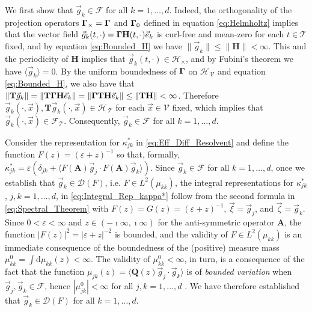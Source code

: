 \documentclass[11pt]{amsart}
\renewcommand{\d}{\mathrm{d}}
\newcommand{\Tb}{\mathbf{T}}
\newcommand{\Hb}{\mathbf{H}}
\newcommand{\Ab}{\mathbf{A}}
\newcommand{\Qb}{\mathbf{Q}}
\newcommand{\Tc}{\mathcal{T}}
\newcommand{\Vc}{\mathcal{V}}
\newcommand{\Hs}{\mathscr{H}}
\newcommand{\Ds}{\mathscr{D}}
\newcommand{\Fs}{\mathscr{F}}
\newcommand\bGamma{\mbox{\boldmath${\Gamma}$}}
\begin{document}
We first show that $\vec{g}_k\in\Fs$ for
all $k=1,\ldots,d$. Indeed, the orthogonality of the
projection operators $\bGamma_\times=\bGamma$ and $\bGamma_0$ defined in
equation \eqref{eq:Helmholtz} implies that the vector field
$\vec{g}_k(t,\cdot)=\bGamma\Hb(t,\cdot)\vec{e}_k$ is curl-free and mean-zero
for each $t\in\Tc$ fixed, and by equation \eqref{eq:Bounded_H} 
we have $\|\vec{g}_k\|\leq\|\Hb\|<\infty$. This and the periodicity of $\Hb$ implies
that $\vec{g}_k(t,\cdot)\in\Hs_\times$, and by Fubini's theorem \cite{Folland:99}
we have $\langle\vec{g}_k\rangle=0$.  By the uniform boundedness of $\bGamma$ on
$\Hs_{\,\Vc}$ and equation \eqref{eq:Bounded_H}, we also have
\cite{Folland:99} that
$\|\Tb\vec{g}_k\|=\|\Tb\bGamma\Hb\vec{e}_k\|=\|\bGamma\Tb\Hb\vec{e}_k\|\leq\|\Tb\Hb\|<\infty$.   
Therefore $\vec{g}_k(\cdot,\vec{x}),\Tb\vec{g}_k(\cdot,\vec{x})\in\Hs_{\,\Tc}$ for each
$\vec{x}\in\Vc$ fixed, which implies that
$\vec{g}_k(\cdot,\vec{x})\in\Fs_{\Tc}$. Consequently,  $\vec{g}_k\in\Fs$ for
all $k=1,\ldots,d$.



Consider the representation for $\kappa^*_{jk}$ in 
\eqref{eq:Eff_Diff_Resolvent} and define the function
$F(z)=(\varepsilon+z)^{-1}$ so that, formally,
$\kappa^*_{jk}=\varepsilon(\delta_{jk}+\langle F(\Ab)\vec{g}_j\cdot F(\Ab)\vec{g}_k\rangle)$. Since
$\vec{g}_k\in\Fs$ for all $k=1,\ldots,d$, once we establish that
$\vec{g}_k\in\Ds(F)$, i.e. $F\in L^2(\mu_{kk})$, the integral representations
for $\kappa^*_{jk}$, $j,k=1,\ldots,d$, in \eqref{eq:Integral_Rep_kappa*} follow
from the second formula in \eqref{eq:Spectral_Theorem} with
$F(z)=G(z)=(\varepsilon+z)^{-1}$, $\vec{\xi}=\vec{g}_j$, and
$\vec{\zeta}=\vec{g}_k$. Since $0<\varepsilon<\infty$ and 
$z\in(-\imath\infty,\imath\infty)$ for the anti-symmetric operator $\Ab$, the function
$|F(z)|^2=|\varepsilon+z|^{-2}$ is bounded, and the validity of $F\in L^2(\mu_{kk})$ is
an immediate consequence of the boundedness of the (positive) measure
mass $\mu^0_{kk}=\int\d\mu_{kk}(z)<\infty$. The validity of $\mu^0_{kk}<\infty$, in turn,
is a consequence of the fact that the function
$\mu_{jk}(z)=\langle\Qb(z)\vec{g}_j\cdot\vec{g}_k\rangle$ is of \emph{bounded
  variation} when $\vec{g}_j,\vec{g}_k\in\Fs$, hence
$|\mu^0_{jk}|<\infty$ for all $j,k=1,\ldots,d$ \cite{Stone:64}. We have therefore
established that $\vec{g}_k\in\Ds(F)$ for all $k=1,\ldots,d$.     
\end{document}
